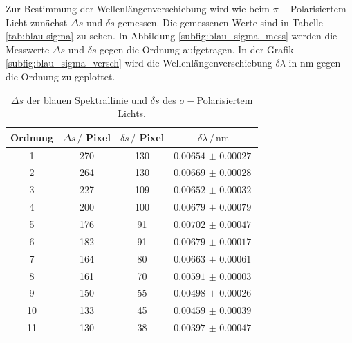 Zur Bestimmung der Wellenlängenverschiebung wird wie beim $\pi -$Polarisiertem Licht zunächst $\Delta s$ und $\delta s$ gemessen.
Die gemessenen Werte sind in Tabelle \autoref{tab:blau-sigma} zu sehen.
In Abbildung \autoref{subfig:blau_sigma_mess} werden die Messwerte $\Delta s$ und $\delta s$ gegen die Ordnung aufgetragen.
In der Grafik \autoref{subfig:blau_sigma_versch} wird die Wellenlängenverschiebung $\delta \lambda$ in $\si{\nano\meter}$ gegen die Ordnung zu geplottet. 

\begin{table}
    \centering
    \caption{$\Delta s$ der blauen Spektrallinie und $\delta s$ des $\sigma -$Polarisiertem Lichts.}
    \begin{tabular}{cccc}
        \toprule
        Ordnung & $\Delta s \, / $ Pixel & $\delta s \, / $ Pixel & $\delta \lambda \, / \,\si{\nano\meter}$ \\
        \midrule
        1   &   270  &    130   & $\SI{0.00654(27)}{}$   \\
        2   &   264  &    130   & $\SI{0.00669(28)}{}$   \\
        3   &   227  &    109   & $\SI{0.00652(32)}{}$   \\
        4   &   200  &    100   & $\SI{0.00679(79)}{}$   \\
        5   &   176  &    91    & $\SI{0.00702(47)}{}$   \\
        6   &   182  &    91    & $\SI{0.00679(17)}{}$   \\
        7   &   164  &    80    & $\SI{0.00663(61)}{}$   \\
        8   &   161  &    70    & $\SI{0.00591(03)}{}$   \\
        9   &   150  &    55    & $\SI{0.00498(26)}{}$   \\
        10  &   133  &    45    & $\SI{0.00459(39)}{}$   \\
        11  &   130  &    38    & $\SI{0.00397(47)}{}$   \\
        \bottomrule
    \end{tabular}
    \label{tab:blau-sigma}
\end{table}

